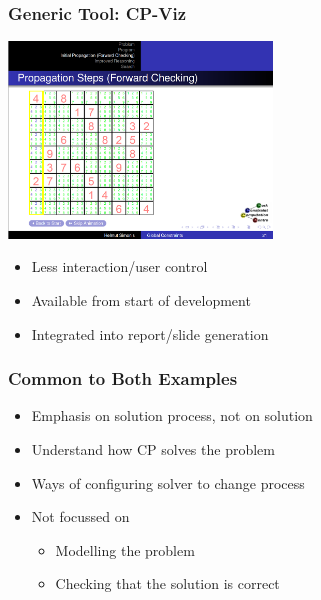 \documentclass[dvipsnames,aspectratio=169]{beamer}
\begin{document}
\begin{frame}
\frametitle{Generic Tool: CP-Viz \cite{DBLP:conf/cp/SimonisDFMQC10}}
\includegraphics[width=7cm]{images/cpvizsudoku}
\begin{itemize}
\item Less interaction/user control
\item Available from start of development
\item Integrated into report/slide generation
\end{itemize}
\end{frame}

\begin{frame}
\frametitle{Common to Both Examples}
\begin{itemize}
\item Emphasis on solution process, not on solution
\item Understand how CP solves the problem
\item Ways of configuring solver to change process
\item Not focussed on 
\begin{itemize}
\item Modelling the problem
\item Checking that the solution is correct
\end{itemize}
\end{itemize}
\end{frame}
\end{document}
